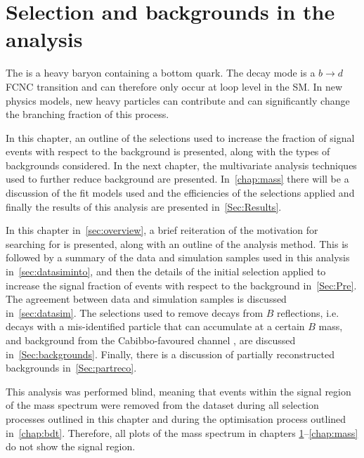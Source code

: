\chapter{Selection and backgrounds in the \boldmath{\Lbpi} analysis}
\label{chap:sel}
The \Lb is a heavy baryon containing a bottom quark. The decay mode \Lbpi is a $b\to d$ \Gls{FCNC} transition and can therefore only occur at loop level in the SM. In new physics models, new heavy particles can contribute and can significantly change the branching fraction of this process.

In this chapter, an outline of the selections used to increase the fraction of signal events with respect to the background is presented, along with the types of backgrounds considered. In the next chapter, the multivariate analysis techniques used to further reduce background are presented. In~\autoref{chap:mass} there will be a discussion of the fit models used and the efficiencies of the selections applied and finally the results of this analysis are presented in~\autoref{Sec:Results}.

In this chapter in~\autoref{sec:overview}, a brief reiteration of the motivation for searching for \Lbpi is presented, along with an outline of the analysis method. This is followed by a summary of the data and simulation samples used in this analysis in~\autoref{sec:datasiminto}, and then the details of the initial selection applied to increase the signal fraction of events with respect to the background in~\autoref{Sec:Pre}. The agreement between data and simulation samples is discussed in~\autoref{sec:datasim}. The selections used to remove decays from $B$ reflections, i.e. decays with a mis-identified particle that can accumulate at a certain $B$ mass, and background from the Cabibbo-favoured channel \LbK, are discussed in~\autoref{Sec:backgrounds}. Finally, there is a discussion of partially reconstructed backgrounds in~\autoref{Sec:partreco}. %

This analysis was performed blind, meaning that events within the signal region of the \Lbpi mass spectrum were removed from the dataset during all selection processes outlined in this chapter and during the optimisation process outlined in~\autoref{chap:bdt}. Therefore, all plots of the \Lbpi mass spectrum in chapters \ref{chap:sel}--\ref{chap:mass} do not show the signal region.


